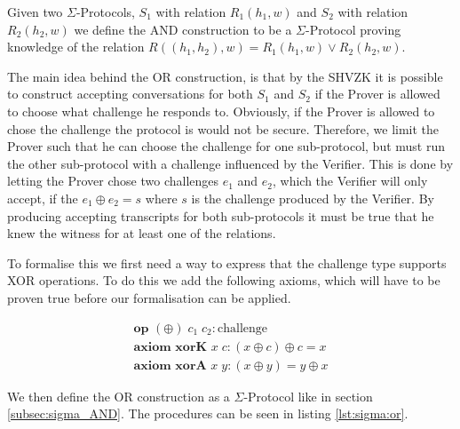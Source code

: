 Given two $\Sigma$-Protocols, $S_{1}$ with relation $R_{1}(h_{1},w)$ and
$S_{2}$ with relation $R_{2}(h_{2},w)$ we define the AND construction to be a
$\Sigma$-Protocol proving knowledge of the relation
$R((h_{1}, h_{2}), w) = R_{1}(h_{1}, w) \lor R_{2}(h_{2}, w)$.

The main idea behind the OR construction, is that by the SHVZK it is possible to
construct accepting conversations for both $S_{1}$ and $S_{2}$ if the Prover is
allowed to choose what challenge he responds to. Obviously, if the Prover is
allowed to chose the challenge the protocol is would not be secure. Therefore,
we limit the Prover such that he can choose the challenge for one sub-protocol,
but must run the other sub-protocol with a challenge influenced by the Verifier.
This is done by letting the Prover chose two challenges $e_{1}$ and $e_{2}$,
which the Verifier will only accept, if the $e_{1} \oplus e_{2} = s$ where $s$
is the challenge produced by the Verifier.
By producing accepting transcripts for both sub-protocols it must be true that
he knew the witness for at least one of the relations.

To formalise this we first need a way to express that the challenge type
supports XOR operations. To do this we add the following axioms, which will have
to be proven true before our formalisation can be applied.

\begin{gather}
  \textbf{op } (\oplus) \; c_{1} \; c_{2} : \text{challenge} \label{def:op:xor} \\
  \textbf{axiom xorK } x \; c : (x \oplus c) \oplus c = x \label{axiom:xorK} \\
  \textbf{axiom xorA } x \; y : (x \oplus y) = y \oplus x \label{axiom:xorA}
\end{gather}


We then define the OR construction as a $\Sigma$-Protocol like in section
\ref{subsec:sigma_AND}. The procedures can be seen in listing \ref{lst:sigma:or}.

